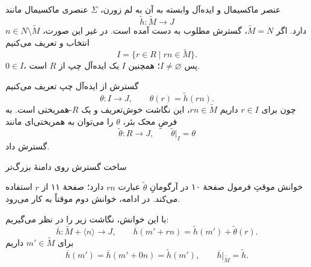 \begin{frame}[t]{عنصر ماکسیمال و ایده‌آل وابسته به آن}
\label{lec17:baer-maximal-extension}
به لم زورن، $\Sigma$ عنصری ماکسیمال مانند
\[
\widetilde h:\widetilde M\longrightarrow J
\]
دارد. اگر $\widetilde M=N$، گسترش مطلوب به دست آمده است.
در غیر این صورت، $n\in N\setminus\widetilde M$ انتخاب و تعریف می‌کنیم
\[
I=\{r\in R\mid rn\in\widetilde M\}.
\]
$0\in I$، پس $I\ne\varnothing$؛ همچنین $I$ یک ایده‌آل چپ از $R$ است.
\end{frame}

\begin{frame}[t]{گسترش از ایده‌آل چپ}
\label{lec17:baer-ideal-extension}
تعریف می‌کنیم
\[
\theta:I\longrightarrow J,\qquad \theta(r)=\widetilde h(rn).
\]
چون برای $r\in I$ داریم $rn\in\widetilde M$، این نگاشت خوش‌تعریف و
یک $R$-همریختی است.
به فرضِ محک بئر، $\theta$ را می‌توان به همریختی‌ای مانند
\[
\widetilde\theta:R\longrightarrow J,\qquad
\widetilde\theta|_I=\theta
\]
گسترش داد.
\end{frame}

\begin{frame}[t]{ساخت گسترش روی دامنهٔ بزرگ‌تر}
\label{lec17:baer-larger-extension}
\begin{alertblock}{خوانش موقتِ فرمول }
صفحهٔ ۱۰ در آرگومانِ $\widetilde\theta$ عبارت $rn$ دارد؛
صفحهٔ ۱۱ از $r$ استفاده می‌کند. در ادامه، خوانش دوم موقتاً به کار می‌رود.
\end{alertblock}
با این خوانش، نگاشت زیر را در نظر می‌گیریم:
\[
\overline h:\widetilde M+\langle n\rangle\longrightarrow J,
\qquad
\overline h(m'+rn)=\widetilde h(m')+\widetilde\theta(r).
\]
برای $m'\in\widetilde M$ داریم
\[
\overline h(m')=\overline h(m'+0n)=\widetilde h(m'),
\qquad \overline h|_{\widetilde M}=\widetilde h.
\]
\end{frame}

